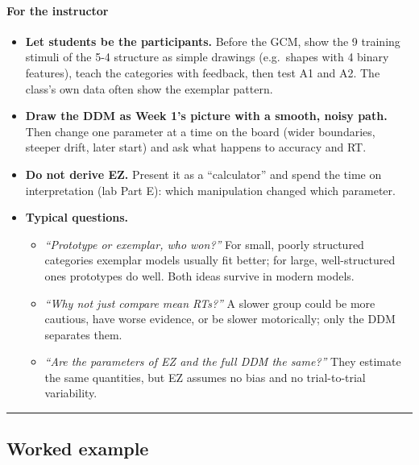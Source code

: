 \paragraph{For the instructor}

\begin{itemize}
\tightlist
\item
  \textbf{Let students be the participants.} Before the GCM, show the 9
  training stimuli of the 5-4 structure as simple drawings (e.g.~shapes
  with 4 binary features), teach the categories with feedback, then test
  A1 and A2. The class's own data often show the exemplar pattern.
\item
  \textbf{Draw the DDM as Week 1's picture with a smooth, noisy path.}
  Then change one parameter at a time on the board (wider boundaries,
  steeper drift, later start) and ask what happens to accuracy and RT.
\item
  \textbf{Do not derive EZ.} Present it as a ``calculator'' and spend
  the time on interpretation (lab Part E): which manipulation changed
  which parameter.
\item
  \textbf{Typical questions.}

  \begin{itemize}
  \tightlist
  \item
    \emph{``Prototype or exemplar, who won?''} For small, poorly
    structured categories exemplar models usually fit better; for large,
    well-structured ones prototypes do well. Both ideas survive in
    modern models.
  \item
    \emph{``Why not just compare mean RTs?''} A slower group could be
    more cautious, have worse evidence, or be slower motorically; only
    the DDM separates them.
  \item
    \emph{``Are the parameters of EZ and the full DDM the same?''} They
    estimate the same quantities, but EZ assumes no bias and no
    trial-to-trial variability.
  \end{itemize}
\end{itemize}

\begin{center}\rule{0.5\linewidth}{0.5pt}\end{center}


\subsection{Worked example}

